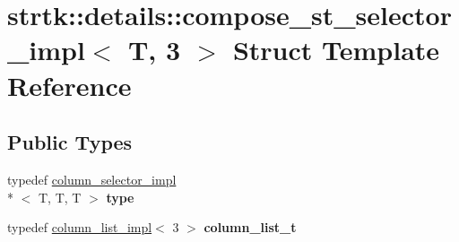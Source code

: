 \hypertarget{structstrtk_1_1details_1_1compose__st__selector__impl_3_01T_00_013_01_4}{\section{strtk\-:\-:details\-:\-:compose\-\_\-st\-\_\-selector\-\_\-impl$<$ T, 3 $>$ Struct Template Reference}
\label{structstrtk_1_1details_1_1compose__st__selector__impl_3_01T_00_013_01_4}
}
\subsection*{Public Types}
\begin{DoxyCompactItemize}
\item 
\hypertarget{structstrtk_1_1details_1_1compose__st__selector__impl_3_01T_00_013_01_4_af07f5f59e4905f132f1a32c54e92c376}{typedef \hyperlink{classstrtk_1_1details_1_1column__selector__impl}{column\-\_\-selector\-\_\-impl}\\*
$<$ T, T, T $>$ {\bfseries type}}\label{structstrtk_1_1details_1_1compose__st__selector__impl_3_01T_00_013_01_4_af07f5f59e4905f132f1a32c54e92c376}

\item 
\hypertarget{structstrtk_1_1details_1_1compose__st__selector__impl_3_01T_00_013_01_4_a7753660d960c26e76bf2f6dfa435d5db}{typedef \hyperlink{structstrtk_1_1details_1_1column__list__impl}{column\-\_\-list\-\_\-impl}$<$ 3 $>$ {\bfseries column\-\_\-list\-\_\-t}}\label{structstrtk_1_1details_1_1compose__st__selector__impl_3_01T_00_013_01_4_a7753660d960c26e76bf2f6dfa435d5db}

\end{DoxyCompactItemize}
